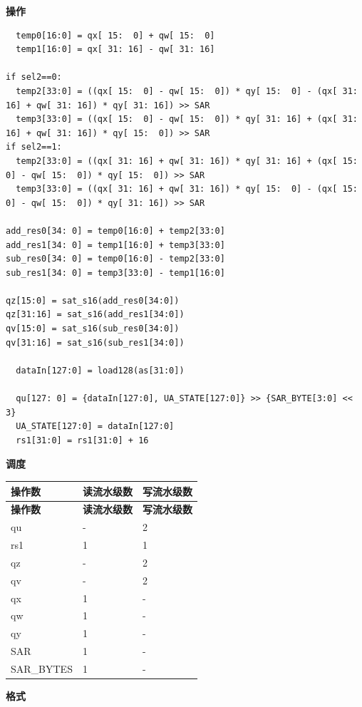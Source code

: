 \textbf{操作}
\begin{lstlisting}
  temp0[16:0] = qx[ 15:  0] + qw[ 15:  0]
  temp1[16:0] = qx[ 31: 16] - qw[ 31: 16]

if sel2==0:
  temp2[33:0] = ((qx[ 15:  0] - qw[ 15:  0]) * qy[ 15:  0] - (qx[ 31: 16] + qw[ 31: 16]) * qy[ 31: 16]) >> SAR
  temp3[33:0] = ((qx[ 15:  0] - qw[ 15:  0]) * qy[ 31: 16] + (qx[ 31: 16] + qw[ 31: 16]) * qy[ 15:  0]) >> SAR
if sel2==1:
  temp2[33:0] = ((qx[ 31: 16] + qw[ 31: 16]) * qy[ 31: 16] + (qx[ 15:  0] - qw[ 15:  0]) * qy[ 15:  0]) >> SAR
  temp3[33:0] = ((qx[ 31: 16] + qw[ 31: 16]) * qy[ 15:  0] - (qx[ 15:  0] - qw[ 15:  0]) * qy[ 31: 16]) >> SAR

add_res0[34: 0] = temp0[16:0] + temp2[33:0]
add_res1[34: 0] = temp1[16:0] + temp3[33:0]
sub_res0[34: 0] = temp0[16:0] - temp2[33:0]
sub_res1[34: 0] = temp3[33:0] - temp1[16:0]

qz[15:0] = sat_s16(add_res0[34:0])
qz[31:16] = sat_s16(add_res1[34:0])
qv[15:0] = sat_s16(sub_res0[34:0])
qv[31:16] = sat_s16(sub_res1[34:0])

  dataIn[127:0] = load128(as[31:0])

  qu[127: 0] = {dataIn[127:0], UA_STATE[127:0]} >> {SAR_BYTE[3:0] << 3}
  UA_STATE[127:0] = dataIn[127:0]
  rs1[31:0] = rs1[31:0] + 16
\end{lstlisting}

\textbf{调度}\\
\begin{longtable}[c]{|l|l|l|}
    \hline
    \rowcolor{lightgray}
    \textbf{操作数} & \textbf{读流水级数} & \textbf{写流水级数} \\\hline
    \endfirsthead
    \hline
    \rowcolor{lightgray}
     \textbf{操作数} & \textbf{读流水级数} & \textbf{写流水级数} \\\hline
    \endhead
    \hline
    \endfoot

  qu & - & 2 \\\hline
  rs1 & 1 & 1 \\\hline
  qz & - & 2 \\\hline
  qv & - & 2 \\\hline
  qx & 1 & - \\\hline
  qw & 1 & - \\\hline
  qy & 1 & - \\\hline
  SAR & 1 & - \\\hline
  SAR\_BYTES & 1 & -

\end{longtable}

\textbf{格式}\\

